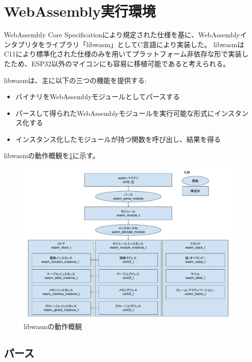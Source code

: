 \section{WebAssembly実行環境}

WebAssembly Core Specification\cite{wasm_spec}により規定された仕様を基に、WebAssemblyインタプリタをライブラリ「libwasm」としてC言語により実装した。
libwasmはC11により標準化された仕様のみを用いてプラットフォーム非依存な形で実装したため、ESP32以外のマイコンにも容易に移植可能であると考えられる。

libwasmは、主に以下の三つの機能を提供する:

\begin{itemize}
  \item バイナリをWebAssemblyモジュールとしてパースする
  \item パースして得られたWebAssemblyモジュールを実行可能な形式にインスタンス化する
  \item インスタンス化したモジュールが持つ関数を呼び出し、結果を得る
\end{itemize}

libwasmの動作概観を\ref{fig:libwasm_arch}に示す。

\begin{figure}[htbp]
  \caption{libwasmの動作概観}
  \label{fig:libwasm_arch}
  \begin{center}
    \includegraphics[bb=0 0 915 667,width=15cm]{img/libwasm_arch.pdf}
  \end{center}
\end{figure}

\subsection{パース}

